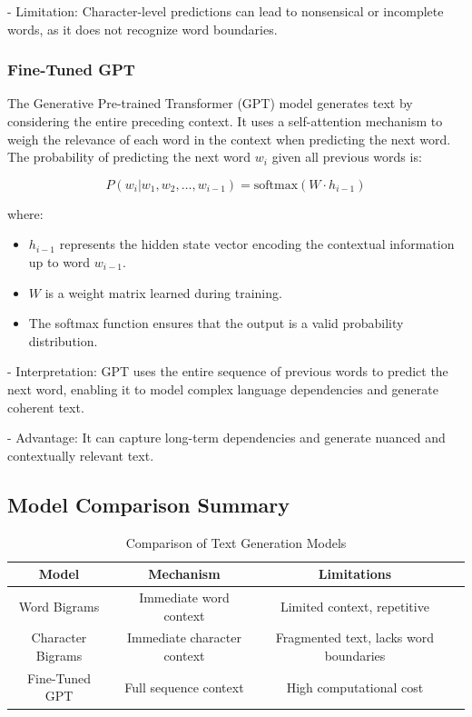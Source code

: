 \documentclass[journal,onecolumn]{IEEEtran}
\begin{document}
- Limitation: Character-level predictions can lead to nonsensical or incomplete words, as it does not recognize word boundaries.

\subsubsection{Fine-Tuned GPT}
The Generative Pre-trained Transformer (GPT) model generates text by considering the entire preceding context. It uses a self-attention mechanism to weigh the relevance of each word in the context when predicting the next word. The probability of predicting the next word \( w_{i} \) given all previous words is:

\[
P(w_{i} | w_{1}, w_{2}, \ldots, w_{i-1}) = \text{softmax}(W \cdot h_{i-1})
\]

where:
\begin{itemize}
    \item \( h_{i-1} \) represents the hidden state vector encoding the contextual information up to word \( w_{i-1} \).
    \item \( W \) is a weight matrix learned during training.
    \item The softmax function ensures that the output is a valid probability distribution.
\end{itemize}

- Interpretation: GPT uses the entire sequence of previous words to predict the next word, enabling it to model complex language dependencies and generate coherent text.

- Advantage: It can capture long-term dependencies and generate nuanced and contextually relevant text.


\subsection{Model Comparison Summary}

\begin{table}[H]
\caption{Comparison of Text Generation Models}
\centering
\begin{tabular}{|c|c|c|c|}
\hline
\textbf{Model} & \textbf{Mechanism} & \textbf{Limitations} \\ \hline
Word Bigrams & Immediate word context & Limited context, repetitive \\ \hline
Character Bigrams & Immediate character context & Fragmented text, lacks word boundaries \\ \hline
Fine-Tuned GPT & Full sequence context & High computational cost \\ \hline
\end{tabular}
\end{table}
\end{document}
